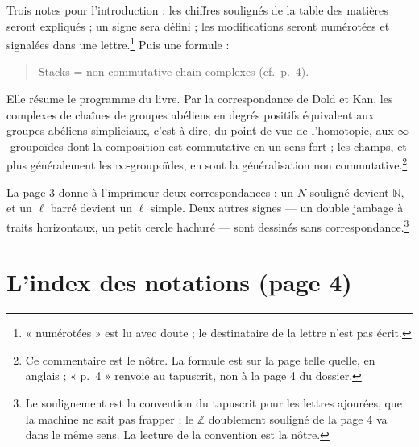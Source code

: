 \documentclass[11pt,a4paper]{article}
\begin{document}
Trois notes pour l'introduction : les chiffres soulignés de la table des
matières seront expliqués ; un signe sera défini ; les modifications seront
numérotées et signalées dans une lettre.\footnote{« numérotées » est lu avec
doute ; le destinataire de la lettre n'est pas écrit.} Puis une formule :
\begin{quote}
Stacks = non commutative chain complexes (cf.\ p.\ 4).
\end{quote}
Elle résume le programme du livre. Par la correspondance de Dold et Kan, les
complexes de chaînes de groupes abéliens en degrés positifs équivalent aux
groupes abéliens simpliciaux, c'est-à-dire, du point de vue de l'homotopie,
aux $\infty$-groupoïdes dont la composition est commutative en un sens fort ;
les champs, et plus généralement les $\infty$-groupoïdes, en sont la
généralisation non commutative.\footnote{Ce commentaire est le nôtre. La
formule est sur la page telle quelle, en anglais ; « p.\ 4 » renvoie au
tapuscrit, non à la page 4 du dossier.}

La page 3 donne à l'imprimeur deux correspondances : un $N$ souligné devient
$\mathbb{N}$, et un $\ell$ barré devient un $\ell$ simple. Deux autres signes
--- un double jambage à traits horizontaux, un petit cercle hachuré --- sont
dessinés sans correspondance.\footnote{Le soulignement est la convention du
tapuscrit pour les lettres ajourées, que la machine ne sait pas frapper ; le
$\mathbb{Z}$ doublement souligné de la page 4 va dans le même sens. La
lecture de la convention est la nôtre.}

\section*{L'index des notations (page 4)}
\end{document}
